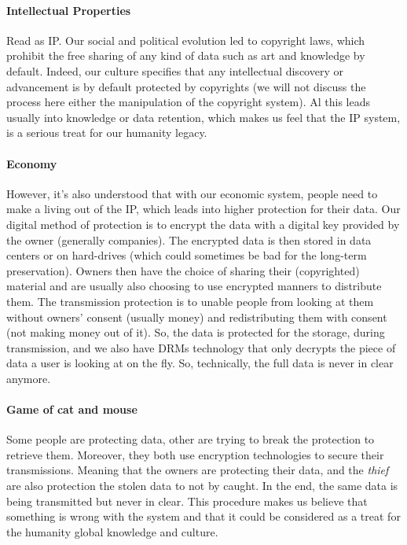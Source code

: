 \paragraph{Intellectual Properties} Read as IP. Our social and political evolution led to copyright laws, which prohibit the free sharing of any kind of data such as art and knowledge by default. Indeed, our culture specifies that any intellectual discovery or advancement is by default protected by copyrights (we will not discuss the process here either the manipulation of the copyright system). Al this leads usually into knowledge or data retention, which makes us feel that the IP system, is a serious treat for our humanity legacy.

\paragraph{Economy} However, it's also understood that with our economic system, people need to make a living out of the IP, which leads into higher protection for their data. Our digital method of protection is to encrypt the data with a digital key provided by the owner (generally companies). The encrypted data is then stored in data centers or on hard-drives (which could sometimes be bad for the long-term preservation). Owners then have the choice of sharing their (copyrighted) material and are usually also choosing to use encrypted manners to distribute them. The transmission protection is to unable people from looking at them without owners' consent (usually money) and redistributing them with consent (not making money out of it). So,  the data is protected for the storage, during transmission, and we also have DRMs technology that only decrypts the piece of data a user is looking at on the fly. So, technically, the full data is never in clear anymore.

\paragraph{Game of cat and mouse} Some people are protecting data, other are trying to break the protection to retrieve them. Moreover, they both use encryption technologies to secure their transmissions. Meaning that the owners are protecting their data, and the \textit{thief} are also protection the stolen data to not by caught. In the end, the same data is being transmitted but never in clear. This procedure makes us believe that something is wrong with the system and that it could be considered as a treat for the humanity global knowledge and culture.

